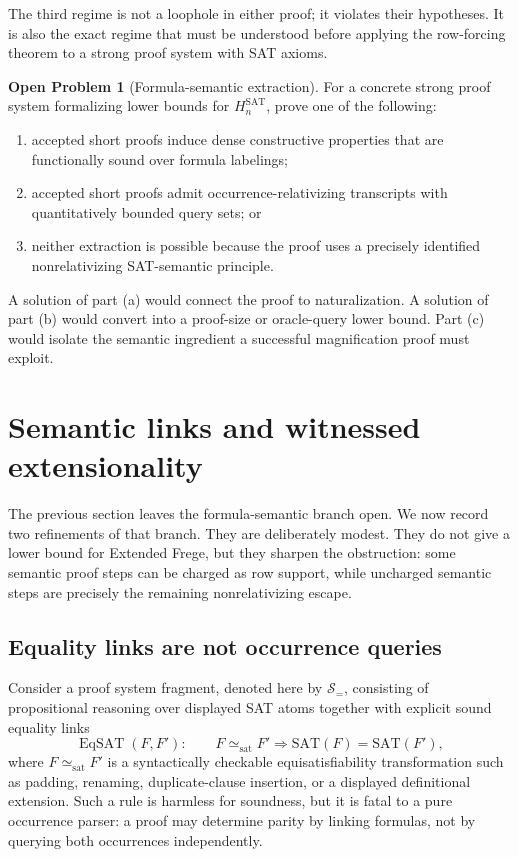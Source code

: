 \documentclass[11pt]{article}
\theoremstyle{definition}
\newtheorem{openproblem}[theorem]{Open Problem}
\newcommand{\SAT}{\mathrm{SAT}}
\newcommand{\EqSAT}{\operatorname{EqSAT}}
\begin{document}
The third regime is not a loophole in either proof; it violates their hypotheses. It is also the exact regime that must be understood before applying the row-forcing theorem to a strong proof system with SAT axioms.

\begin{openproblem}[Formula-semantic extraction]\label{op:semantic-extraction}
For a concrete strong proof system formalizing lower bounds for $H_n^{\SAT}$, prove one of the following:
\begin{enumerate}[label=(\alph*)]
  \item accepted short proofs induce dense constructive properties that are functionally sound over formula labelings;
  \item accepted short proofs admit occurrence-relativizing transcripts with quantitatively bounded query sets; or
  \item neither extraction is possible because the proof uses a precisely identified nonrelativizing SAT-semantic principle.
\end{enumerate}
\end{openproblem}

A solution of part (a) would connect the proof to naturalization. A solution of part (b) would convert  into a proof-size or oracle-query lower bound. Part (c) would isolate the semantic ingredient a successful magnification proof must exploit.

\section{Semantic links and witnessed extensionality}\label{sec:semantic-links}

The previous section leaves the formula-semantic branch open. We now record two refinements of that branch. They are deliberately modest. They do not give a lower bound for Extended Frege, but they sharpen the obstruction: some semantic proof steps can be charged as row support, while uncharged semantic steps are precisely the remaining nonrelativizing escape.

\subsection{Equality links are not occurrence queries}

Consider a proof system fragment, denoted here by $\mathcal{S}_{=}$, consisting of propositional reasoning over displayed SAT atoms together with explicit sound equality links
\[
  \EqSAT(F,F'):\qquad F\simeq_{\mathrm{sat}}F'\Longrightarrow \SAT(F)=\SAT(F'),
\]
where $F\simeq_{\mathrm{sat}}F'$ is a syntactically checkable equisatisfiability transformation such as padding, renaming, duplicate-clause insertion, or a displayed definitional extension. Such a rule is harmless for soundness, but it is fatal to a pure occurrence parser: a proof may determine parity by linking formulas, not by querying both occurrences independently.
\end{document}
